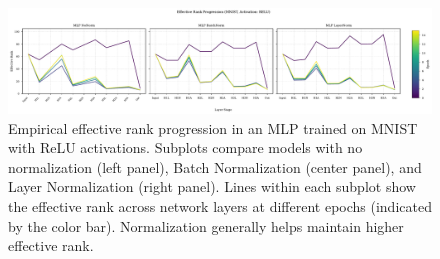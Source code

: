 \documentclass{article}
\begin{document}
\begin{figure}[ht!]
    \centering
    \includegraphics[width=\textwidth]{empirical_rank_progression_relu_mnist.pdf} 
    \caption{Empirical effective rank progression in an MLP trained on MNIST with ReLU activations. Subplots compare models with no normalization (left panel), Batch Normalization (center panel), and Layer Normalization (right panel). Lines within each subplot show the effective rank across network layers at different epochs (indicated by the color bar). Normalization generally helps maintain higher effective rank.}
    \label{fig:empirical_rank_progression}
\end{figure}
\end{document}
